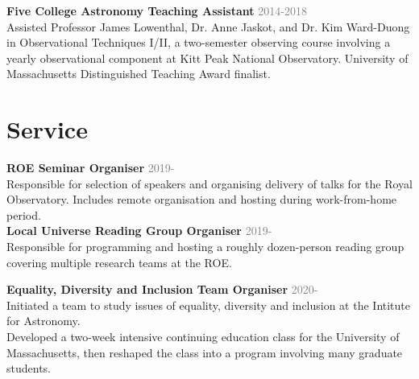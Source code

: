 \documentclass[margin, 11pt]{res} %
\begin{document}
\begin{resume}
{\bf Five College Astronomy Teaching Assistant} \hfill \textcolor{grey}{2014-2018}\\
Assisted Professor James Lowenthal, Dr. Anne Jaskot, and Dr. Kim Ward-Duong in Observational Techniques I/II, a two-semester observing course involving a yearly observational component at Kitt Peak National Observatory. University of Massachusetts Distinguished Teaching Award finalist.\\


\section{\sc \textcolor{redshade}{Service}}

{\bf ROE Seminar Organiser} \hfill\textcolor{grey}{2019-}\\
Responsible for selection of speakers and organising delivery of talks for the Royal Observatory. Includes remote organisation and hosting during work-from-home period.\\

{\bf Local Universe Reading Group Organiser} \hfill\textcolor{grey}{2019-}\\
Responsible for programming and hosting a roughly dozen-person reading
group covering multiple research teams at the ROE.

{\bf Equality, Diversity and Inclusion Team Organiser} \hfill\textcolor{grey}{2020-}\\
Initiated a team to study issues of equality, diversity and inclusion at the Intitute for Astronomy.\\




Developed a two-week intensive continuing education class for the University of Massachusetts, then reshaped the class into a program involving many graduate students.

%


\end{resume}
\end{document}
